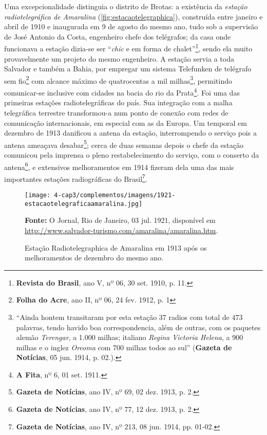 Uma excepcionalidade distinguia o distrito de Brotas: a existência da \textit{estação radiotelegráfica de Amaralina} (\autoref{fig:estacaotelegraphica}), construída entre janeiro e abril de 1910 e inaugurada em 9 de agosto do mesmo ano, tudo sob a supervisão de José Antonio da Costa, engenheiro chefe dos telégrafos; da casa onde funcionava a estação dizia-se ser ``\textit{chic} e em forma de chalet''\footnote{\textbf{Revista do Brasil}, ano V, nº 06, 30 set. 1910, p. 11.}, sendo ela muito provavelmente um projeto do mesmo engenheiro. A estação servia a toda Salvador e também a Bahia, por empregar um sistema Telefunken de telégrafo sem fio\footnote{\textbf{Folha do Acre}, ano II, nº 06, 24 fev. 1912, p. 1} com alcance máximo de quatrocentas a mil milhas\footnote{``Ainda hontem transitaram por esta estação 37 radios com total de 473 palavras, tendo havido boa correspondencia, além de outras, com os paquetes alemão \textit{Terengar}, a 1.000 milhas; italiano \textit{Regina Victoria Helena}, a 900 milhas e o inglez \textit{Oreoma} com 700 milhas todos ao sul'' (\textbf{Gazeta de Notícias}, 05 jun. 1914, p. 02.).}, permitindo comunicar-se inclusive com cidades na bacia do rio da Prata\footnote{\textbf{A Fita}, nº 6, 01 set. 1911.}. Foi uma das primeiras estações radiotelegráficas do país. Sua integração com a malha telegráfica terrestre transformou-a num ponto de conexão com redes de comunicação internacionais, em especial com as da Europa. Um temporal em dezembro de 1913 danificou a antena da estação, interrompendo o serviço pois a antena ameaçava desabar\footnote{\textbf{Gazeta de Notícias}, ano IV, nº 69, 02 dez. 1913, p. 2.}; cerca de duas semanas depois o chefe da estação comunicou pela imprensa o pleno restabelecimento do serviço, com o conserto da antena\footnote{\textbf{Gazeta de Notícias}, ano IV, nº 77, 12 dez. 1913, p. 2.}, e extensivos melhoramentos em 1914 fizeram dela uma das mais importantes estações radiográficas do Brasil\footnote{\textbf{Gazeta de Notícias}, ano IV, nº 213, 08 jun. 1914, pp. 01-02.}. 

\begin{figure}[!htp]
\centering
\caption{Estação Radiotelegraphica de Amaralina em 1913 após os melhoramentos de dezembro do mesmo ano.}
\texttt{[image: 4-cap3/complementos/imagens/1921-estacaotelegraficaamaralina.jpg]}{\par \footnotesize \textbf{Fonte:} O Jornal, Rio de Janeiro, 03 jul. 1921, disponível em \url{http://www.salvador-turismo.com/amaralina/amaralina.htm}.}
\label{fig:estacaotelegraphica}
\end{figure}

